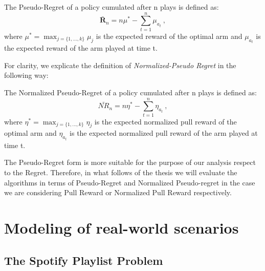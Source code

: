 \begin{definition}
	The Pseudo-Regret of a policy cumulated after n plays is defined as:
		$$\bm\bar{R}_{n}=n{\mu^{*}}- \sum_{t=1}^{n} \mu_{a_t} \ ,$$
	where  $\mu^{*}=\max_{j = \{1,\dots,k\}} \mu_j$ is the expected reward of the optimal arm and $\mu_{a_t}$ is the expected reward of the arm played at time t.
\end{definition}
For clarity, we explicate the definition of \emph{Normalized-Pseudo Regret} in the following way:
\begin{definition}
	The Normalized Pseudo-Regret of a policy cumulated after n plays is defined as:
	$$\bm\bar{\mathit{NR}}_{n}=n{\eta^{*}}- \sum_{t=1}^{n} \eta_{a_t} \ , $$
	where  $\eta^{*}=\max_{j = \{1,\dots,k\}} \eta_j$ is the expected normalized pull reward of the optimal arm and $\eta_{a_t}$ is the expected normalized pull reward of the arm played at time t.
\end{definition}



The Pseudo-Regret form is more suitable for the purpose of our analysis respect to the Regret. Therefore, in what follows of the thesis we will evaluate the algorithms in terms of Pseudo-Regret and Normalized Pseudo-regret in the case we are considering Pull Reward or Normalized Pull Reward respectively.



\section{Modeling of real-world scenarios}
\subsection{The Spotify Playlist Problem}

